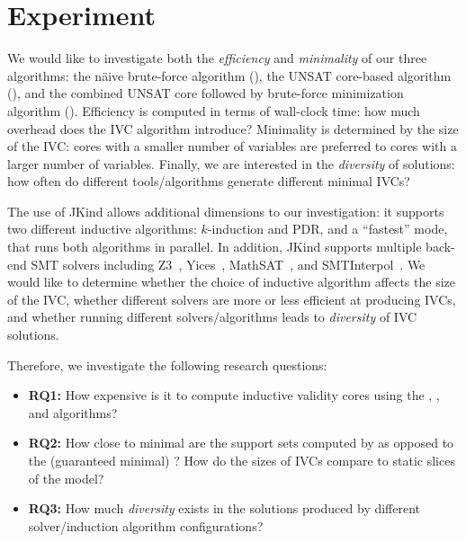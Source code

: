 \section{Experiment}
\label{sec:experiment}


We would like to investigate both the {\em efficiency} and {\em
  minimality} of our three algorithms: the n{\"a}ive brute-force
algorithm (\bfalg), the UNSAT core-based algorithm (\ucalg), and the
combined UNSAT core followed by brute-force minimization algorithm
(\ucbfalg). Efficiency is computed in terms of wall-clock time: how
much overhead does the IVC algorithm introduce? Minimality is
determined by the size of the IVC: cores with a smaller number of
variables are preferred to cores with a larger number of variables.
Finally, we are interested in the {\em diversity} of solutions: how
often do different tools/algorithms generate different minimal IVCs?

The use of JKind allows additional dimensions to our investigation: it supports two different inductive algorithms: $k$-induction and PDR, and a ``fastest'' mode, that runs both algorithms in parallel.  In addition, JKind supports multiple back-end SMT solvers including Z3~\cite{DeMoura08:z3}, Yices~\cite{Dutertre06:yices}, MathSAT~\cite{Cimatti2013:MathSAT}, and SMTInterpol~\cite{Christ2012:SMTInterpol}.  We would like to determine whether the choice of inductive algorithm affects the size of the IVC, whether different solvers are more or less efficient at producing IVCs, and whether running different solvers/algorithms leads to {\em diversity} of IVC solutions.

Therefore, we investigate the following research questions:
\begin{itemize}
    \item \textbf{RQ1:} How expensive is it to compute inductive validity cores using the \bfalg, \ucalg, and \ucbfalg algorithms?
    \item \textbf{RQ2:} How close to minimal are the support sets computed by \ucalg as opposed to the (guaranteed minimal) \ucbfalg?  How do the sizes of IVCs compare to static slices of the model?
    \item \textbf{RQ3:} How much {\em diversity} exists in the solutions produced by different solver/induction algorithm configurations?
\end{itemize}


